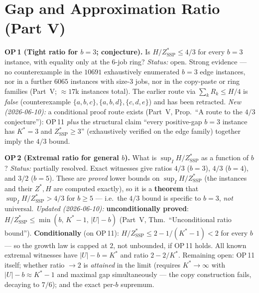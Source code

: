 \documentclass[11pt,a4paper]{article}
\newcommand{\ZSSP}{Z_{\mathrm{SSP}}^{*}}
\newcommand{\Kstar}{K^{*}}
\begin{document}
\section{Gap and Approximation Ratio (Part V)}
\begin{op}
\textbf{OP\,1 (Tight ratio for $b=3$; conjecture).} Is $H/\ZSSP \le 4/3$ for every
$b=3$ instance, with equality only at the $6$-job ring?
\emph{Status:} open. Strong evidence --- no counterexample in the $10691$ exhaustively
enumerated $b=3$ edge instances, nor in a further $6065$ instances with size-$3$ jobs, nor
in the copy-paste or ring families (Part~V; $\approx 17$k instances total). The earlier
route via $\sum_k R_k \le H/4$ is \emph{false} (counterexample
$\{a,b,c\},\{a,b,d\},\{c,d,e\}$) and has been retracted.
\emph{New (2026-06-10):} a conditional proof route exists (Part~V,
Prop.\ ``A route to the $4/3$ conjecture''): OP\,11 \emph{plus} the structural
claim ``every positive-gap $b=3$ instance has $\Kstar=3$ and $\ZSSP\ge3$''
(exhaustively verified on the edge family) together imply the $4/3$ bound.
\end{op}
\begin{op}
\textbf{OP\,2 (Extremal ratio for general $b$).} What is $\sup_I H/\ZSSP$ as a function
of $b$? \emph{Status:} partially resolved. Exact witnesses give ratios $4/3$ ($b=3$), $4/3$ ($b=4$),
and $3/2$ ($b=5$). These are \emph{proved} lower bounds on $\sup_I H/\ZSSP$ (the instances and
their $Z^*,H$ are computed exactly), so it is a \textbf{theorem} that $\sup_I H/\ZSSP>4/3$ for
$b\ge5$ --- i.e.\ the $4/3$ bound is specific to $b=3$, \emph{not} universal.
\emph{Updated (2026-06-10):} \textbf{unconditionally proved}:
$H/\ZSSP\le\min(b,\,\Kstar-1,\,|U|-b)$ (Part~V, Thm.\ ``Unconditional ratio
bound''). \textbf{Conditionally} (on OP\,11): $H/\ZSSP\le2-1/(\Kstar-1)<2$ for
every $b$ --- so the growth law is capped at $2$, not unbounded, if OP\,11
holds. All known extremal witnesses have $|U|-b=\Kstar$ and ratio $2-2/\Kstar$.
Remaining open: OP\,11 itself; whether ratio $\to2$ is \emph{attained} in the
limit (requires $\Kstar\to\infty$ with $|U|-b\approx\Kstar-1$ and maximal gap
simultaneously --- the copy construction fails, decaying to $7/6$); and the
exact per-$b$ supremum.
\end{op}
\end{document}
